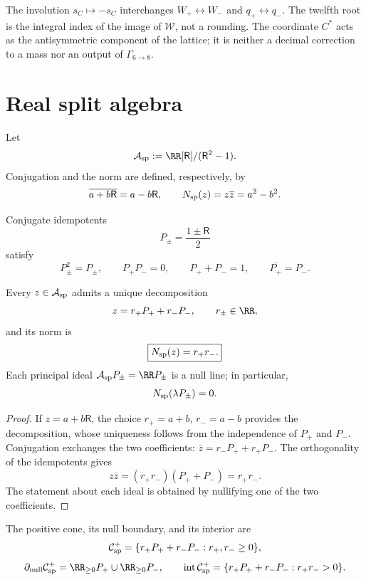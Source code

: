 The involution \(s_C\mapsto-s_C\) interchanges
\(W_+\leftrightarrow W_-\) and \(q_+\leftrightarrow q_-\). The twelfth
root is the integral index of the image of \(\mathcal W\), not a
rounding. The coordinate \(C^*\) acts as the antisymmetric component of the lattice;
it is neither a decimal correction to a mass nor an output of
\(\Gamma_{6\to8}\).

\section{Real split algebra}
\label{sec:algebra-real-partida}

\begin{definition}
Let
\[
 \mathcal A_{\rm sp}
 :=\RR[\mathsf R]/(\mathsf R^2-1).
\]
Conjugation and the norm are defined, respectively, by
\[
 \overline{a+b\mathsf R}=a-b\mathsf R,
 \qquad
 N_{\rm sp}(z)=z\overline z=a^2-b^2.
\]
\end{definition}

Conjugate idempotents
\[
 P_\pm=\frac{1\pm\mathsf R}{2}
\]
satisfy
\[
 P_\pm^2=P_\pm,\qquad
 P_+P_-=0,\qquad
 P_++P_-=1,\qquad
 \overline{P_+}=P_-.
\]

\begin{proposition}
\label{prop:descomposicion-espectral-partida}
Every \(z\in\mathcal A_{\rm sp}\) admits a unique decomposition
\[
 z=r_+P_++r_-P_-,
 \qquad r_\pm\in\RR,
\]
and its norm is
\[
 \boxed{N_{\rm sp}(z)=r_+r_-.}
\]
Each principal ideal \(\mathcal A_{\rm sp}P_\pm=\RR P_\pm\) is a null
line; in particular,
\[
 N_{\rm sp}(\lambda P_\pm)=0.
\]
\end{proposition}

\begin{proof}
If \(z=a+b\mathsf R\), the choice \(r_+=a+b\), \(r_-=a-b\) provides the
decomposition, whose uniqueness follows from the independence of
\(P_+\) and \(P_-\). Conjugation exchanges the two coefficients:
\(\overline z=r_-P_++r_+P_-\). The orthogonality of the idempotents gives
\[
 z\overline z=(r_+r_-)(P_++P_-)=r_+r_-.
\]
The statement about each ideal is obtained by nullifying one of the two coefficients.
\end{proof}

\begin{definition}
\label{def:cono-causal-partido}
The positive cone, its null boundary, and its interior are
\[
 \mathcal C_{\rm sp}^{+}
 =\{r_+P_++r_-P_-:r_+,r_-\geq0\},
\]
\[
 \partial_{\rm null}\mathcal C_{\rm sp}^{+}
 =\RR_{\geq0}P_+\cup\RR_{\geq0}P_-,
\qquad
 \operatorname{int}\mathcal C_{\rm sp}^{+}
 =\{r_+P_++r_-P_-:r_+r_->0\}.
\]
\end{definition}

